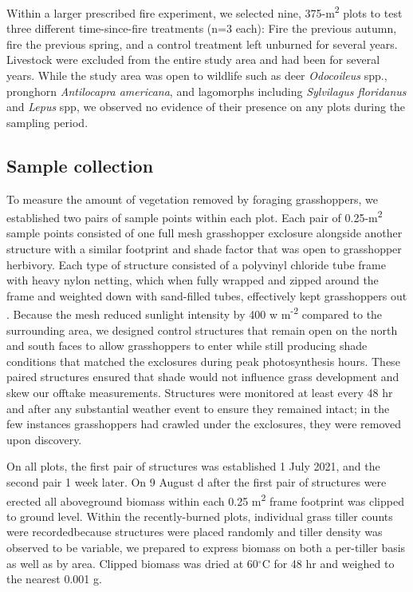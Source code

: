 \documentclass[referee, 
	            sn-basic]
           {sn-jnl}
\begin{document}
\begin{linenumbers}
Within a larger prescribed fire experiment, we selected nine, 375-m\textsuperscript{2} plots to test three different time-since-fire treatments (n=3 each): Fire the previous autumn, fire the previous spring, and a control treatment left unburned for several years. 
Livestock were excluded from the entire study area and had been for several years.
While the study area was open to wildlife such as deer \emph{Odocoileus} spp., pronghorn \emph{Antilocapra americana}, and lagomorphs including \emph{Sylvilagus floridanus} and \emph{Lepus} spp, we observed no evidence of their presence on any plots during the sampling period. 

\subsection{Sample collection}

To measure the amount of vegetation removed by foraging grasshoppers, we established two pairs of sample points within each plot. 
Each pair of 0.25-m\textsuperscript{2} sample points consisted of one full mesh grasshopper exclosure alongside another structure with a similar footprint and shade factor that was open to grasshopper herbivory.
Each type of structure consisted of a polyvinyl chloride tube frame with heavy nylon netting, which when fully wrapped and zipped around the frame and weighted down with sand-filled tubes, effectively kept grasshoppers out \citep{parker1985}. 
Because the mesh reduced sunlight intensity by 400 w m\textsuperscript{-2} compared to the
surrounding area, we designed control structures that remain open on the north and south faces to allow grasshoppers to enter while still producing shade conditions that matched the exclosures during peak photosynthesis hours. 
These paired structures ensured that shade would not influence grass development and skew our offtake measurements. 
Structures were monitored at least every 48 hr and after any substantial weather event to ensure they remained intact; in the few instances grasshoppers had crawled under the exclosures, they were removed upon discovery. 

On all plots, the first pair of structures was established 1 July 2021, and the second pair 1 week later. 
On 9 August d after the first pair of structures were erected\textemdash 
all aboveground biomass within each 0.25 m\textsuperscript{2} frame footprint was clipped to ground level.
Within the recently-burned plots, individual grass tiller counts were recorded\textemdash because structures were placed randomly and tiller density was observed to be variable, we prepared to express biomass on both a per-tiller basis as well as by area. 
Clipped biomass was dried at 60$^\circ$C for 48 hr and weighed to the nearest 0.001 g. 


\end{linenumbers}
\end{document}
